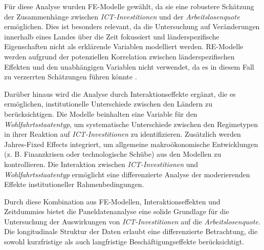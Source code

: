 Für diese Analyse wurden \ac{FE}-Modelle gewählt, da sie eine robustere Schätzung der 
Zusammenhänge zwischen \textit{\ac{ICT}-Investitionen} und der \textit{Arbeitslosenquote} 
ermöglichen. Dies ist besonders relevant, da die Untersuchung auf Veränderungen innerhalb 
eines Landes über die Zeit fokussiert und länderspezifische Eigenschaften nicht als erklärende 
Variablen modelliert werden. \ac{RE}-Modelle werden aufgrund der potenziellen Korrelation 
zwischen länderspezifischen Effekten und den unabhängigen Variablen nicht verwendet, da es in 
diesem Fall zu verzerrten Schätzungen führen könnte 
\parencite[S. 495-496]{wooldridge2010econometric}. 

Darüber hinaus wird die Analyse durch Interaktionseffekte ergänzt, die es ermöglichen, 
institutionelle Unterschiede zwischen den Ländern zu berücksichtigen. Die Modelle beinhalten 
eine Variable für den \textit{Wohlfahrtsstaatentyp}, um systematische Unterschiede zwischen den 
Regimetypen in ihrer Reaktion auf \textit{\ac{ICT}-Investitionen} zu identifizieren. Zusätzlich 
werden Jahres-Fixed Effects integriert, um allgemeine makroökonomische Entwicklungen (z. B. 
Finanzkrisen oder technologische Schübe) aus den Modellen zu kontrollieren. Die Interaktion 
zwischen \textit{\ac{ICT}-Investitionen} und \textit{Wohlfahrtsstaatentyp} ermöglicht eine 
differenzierte Analyse der moderierenden Effekte institutioneller Rahmenbedingungen.

Durch diese Kombination aus \ac{FE}-Modellen, Interaktionseffekten und Zeitdummies bietet die
Paneldatenanalyse eine solide Grundlage für die Untersuchung der Auswirkungen von 
\textit{\ac{ICT}-Investitionen} auf die \textit{Arbeitslosenquote}. Die longitudinale Struktur 
der Daten erlaubt eine differenzierte Betrachtung, die sowohl kurzfristige als auch 
langfristige Beschäftigungseffekte berücksichtigt. 
